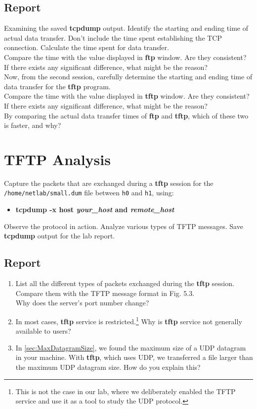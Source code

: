 \documentclass{../UTNetLab}
\begin{document}
	\subsection*{Report}
	Examining the saved \textbf{tcpdump} output. Identify the starting and ending time of actual data transfer.
	Don’t include the time spent establishing the TCP connection.
	Calculate the time spent for data transfer. \\
	Compare the time with the value displayed in \textbf{ftp} window.
	Are they consistent?
	If there exists any significant difference, what might be the reason? \\
	Now, from the second session, carefully determine the starting and ending time of data transfer for the \textbf{tftp} program. \\
	Compare the time with the value displayed in \textbf{tftp} window.
	Are they consistent?
	If there exists any significant difference, what might be the reason? \\
	By comparing the actual data transfer times of \textbf{ftp} and \textbf{tftp}, which of these two is faster, and why?

\section{TFTP Analysis}
	Capture the packets that are exchanged during a \textbf{tftp} session for the \linebreak \texttt{/home/netlab/small.dum} file between \texttt{h0} and \texttt{h1}, using:
	\begin{itemize}
		\item \textbf{tcpdump -x host \textit{your\_host} and \textit{remote\_host}}
	\end{itemize}
	Observe the protocol in action.	Analyze various types of TFTP messages. Save \textbf{tcpdump} output for the lab report.
	\subsection*{Report}
	\begin{enumerate}
		\item List all the different types of packets exchanged during the \textbf{tftp} session. Compare them with the TFTP message format in Fig. 5.3.\\ Why does the server’s port number change?
		\item In most cases, \textbf{tftp} service is restricted.\footnote{This is not the case in our lab, where we deliberately enabled the TFTP service and use it as a tool to study the UDP protocol.}
		Why is \textbf{tftp} service not generally available to users?
		\item In \autoref{sec:MaxDatagramSize}, we found the maximum size of a UDP datagram in your machine. With \textbf{tftp}, which uses UDP, we transferred a file larger than the maximum UDP datagram size.
		How do you explain this?
	\end{enumerate}
\end{document}
